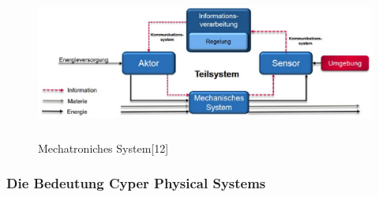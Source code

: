 \begin{figure}[!htb]
\begin{center}
\includegraphics[height=5cm]{bilder/me.eps}
\end{center}
\caption{Mechatroniches System[12]}\label{fig:me}
\end{figure}



\subsubsection{Die Bedeutung Cyper Physical Systems}

